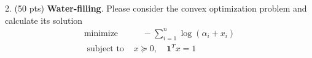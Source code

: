 2. {\color{red} (50 pts)} \textbf{Water-filling}. Please consider the convex optimization problem and calculate its solution
$$
\begin{aligned}
\text {minimize \ \ \ \ \ } & \quad-\sum_{i=1}^n \log \left(\alpha_i+x_i\right) \\
\text { subject to \ \ \ \ \ } & x \succeq 0, \quad \mathbf{1}^T x=1
\end{aligned}
$$

\solution{}







